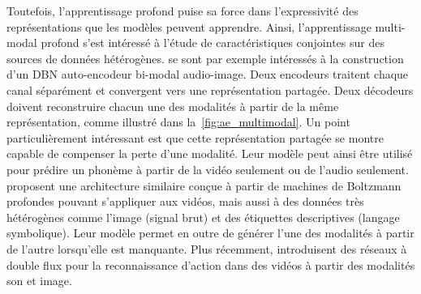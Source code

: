 Toutefois, l'apprentissage profond puise sa force dans l'expressivité des représentations que les modèles peuvent apprendre. Ainsi, l'apprentissage multi-modal profond s'est intéressé à l'étude de caractéristiques conjointes sur des sources de données hétérogènes. \citet{ngiam_multimodal_2011} se sont par exemple intéressés à la construction d'un \gls{DBN} auto-encodeur bi-modal audio-image. Deux encodeurs traitent chaque canal séparément et convergent vers une représentation partagée. Deux décodeurs doivent reconstruire chacun une des modalités à partir de la même représentation, comme illustré dans la~\cref{fig:ae_multimodal}. Un point particulièrement intéressant est que cette représentation partagée se montre capable de compenser la perte d'une modalité. Leur modèle peut ainsi être utilisé pour prédire un phonème à partir de la vidéo seulement ou de l'audio seulement.
\citet{srivastava_multimodal_2014} proposent une architecture similaire conçue à partir de machines de Boltzmann profondes pouvant s'appliquer aux vidéos, mais aussi à des données très hétérogènes comme l'image (signal brut) et des étiquettes descriptives (langage symbolique). Leur modèle permet en outre de générer l'une des modalités à partir de l'autre lorsqu'elle est manquante. Plus récemment, \citet{simonyan_two-stream_2014} introduisent des réseaux à double flux pour la reconnaissance d'action dans des vidéos à partir des modalités son et image.

